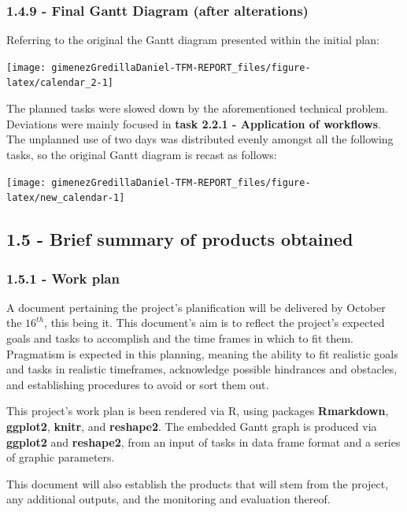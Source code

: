 \documentclass[]{article}
\begin{document}
\subsubsection{1.4.9 - Final Gantt Diagram (after
alterations)}\label{final-gantt-diagram-after-alterations}

Referring to the original the Gantt diagram presented within the initial
plan:

\texttt{[image: gimenezGredillaDaniel-TFM-REPORT\_files/figure-latex/calendar\_2-1]}

The planned tasks were slowed down by the aforementioned technical
problem. Deviations were mainly focused in \textbf{task 2.2.1 -
Application of workflows}. The unplanned use of two days was distributed
evenly amongst all the following tasks, so the original Gantt diagram is
recast as follows:

\texttt{[image: gimenezGredillaDaniel-TFM-REPORT\_files/figure-latex/new\_calendar-1]}

\subsection{1.5 - Brief summary of products
obtained}\label{brief-summary-of-products-obtained}

\subsubsection{1.5.1 - Work plan}\label{work-plan}

A document pertaining the project's planification will be delivered by
October the \(16^{th}\), this being it. This document's aim is to
reflect the project's expected goals and tasks to accomplish and the
time frames in which to fit them. Pragmatism is expected in this
planning, meaning the ability to fit realistic goals and tasks in
realistic timeframes, acknowledge possible hindrances and obstacles, and
establishing procedures to avoid or sort them out.

This project's work plan is been rendered via R, using packages
\textbf{Rmarkdown}, \textbf{ggplot2}, \textbf{knitr}, and
\textbf{reshape2}. The embedded Gantt graph is produced via
\textbf{ggplot2} and \textbf{reshape2}, from an input of tasks in data
frame format and a series of graphic parameters.

This document will also establish the products that will stem from the
project, any additional outputs, and the monitoring and evaluation
thereof.
\end{document}
